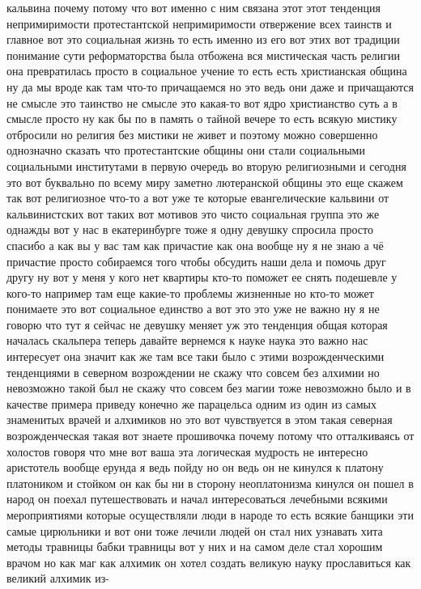 кальвина почему потому что вот именно с ним связана этот этот тенденция
непримиримости протестантской непримиримости отвержение всех таинств и главное
вот это социальная жизнь то есть именно из его вот этих вот традиции понимание
сути реформаторства была отбожена вся мистическая часть религии она превратилась
просто в социальное учение то есть есть христианская община ну да мы вроде как
там что-то причащаемся но это ведь они даже и причащаются не смысле это таинство
не смысле это какая-то вот ядро христианство суть а в смысле просто ну как бы по
в память о тайной вечере то есть всякую мистику отбросили но религия без мистики
не живет и поэтому можно совершенно однозначно сказать что протестантские общины
они стали социальными социальными институтами в первую очередь во вторую
религиозными и сегодня это вот буквально по всему миру заметно лютеранской
общины это еще скажем так вот религиозное что-то а вот уже те которые
евангелические кальвини от кальвинистских вот таких вот мотивов это чисто
социальная группа это же однажды вот у нас в екатеринбурге тоже я одну девушку
спросила просто спасибо а как вы у вас там как причастие как она вообще ну я не
знаю а чё причастие просто собираемся того чтобы обсудить наши дела и помочь
друг другу ну вот у меня у кого нет квартиры кто-то поможет ее снять подешевле у
кого-то например там еще какие-то проблемы жизненные но кто-то может понимаете
это вот социальное единство а вот это это уже не важно ну я не говорю что тут я
сейчас не девушку меняет уж это тенденция общая которая началась скальпера
теперь давайте вернемся к науке наука это важно нас интересует она значит как же
там все таки было с этими возрожденческими тенденциями в северном возрождении не
скажу что совсем без алхимии но невозможно такой был не скажу что совсем без
магии тоже невозможно было и в качестве примера приведу конечно же парацельса
одним из один из самых знаменитых врачей и алхимиков но это вот чувствуется в
этом такая северная возрожденческая такая вот знаете прошивочка почему потому
что отталкиваясь от холостов говоря что мне вот ваша эта логическая мудрость не
интересно аристотель вообще ерунда я ведь пойду но он ведь он не кинулся к
платону платоником и стойком он как бы ни в сторону неоплатонизма кинулся он
пошел в народ он поехал путешествовать и начал интересоваться лечебными всякими
мероприятиями которые осуществляли люди в народе то есть всякие банщики эти
самые цирюльники и вот они тоже лечили людей он стал них узнавать хита методы
травницы бабки травницы вот у них и на самом деле стал хорошим врачом но как маг
как алхимик он хотел создать великую науку прославиться как великий алхимик из-
